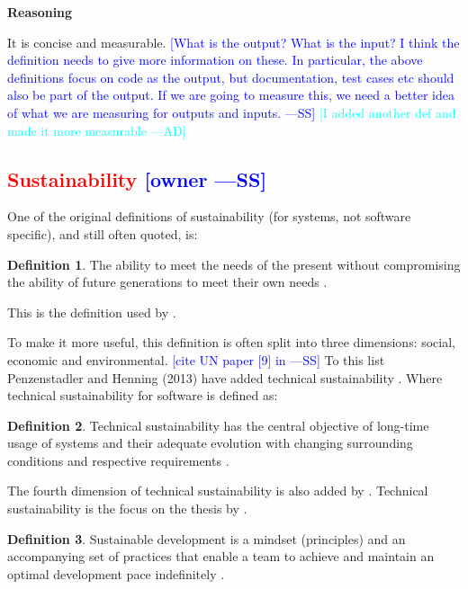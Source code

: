 \documentclass[letterpaper,cleveref]{lipics-v2019}
\newcommand{\authornote}[3]{\textcolor{#1}{[#3 ---#2]}}
\newcommand{\authornote}[3]{}
\newcommand{\wss}[1]{\authornote{blue}{SS}{#1}} %
\newcommand{\ad}[1]{\authornote{cyan}{AD}{#1}} %
\newcommand{\notdone}[1]{\textcolor{red}{#1}}
\theoremstyle{definition}
\newtheorem{defn}{Definition}
\begin{document}
\noindent \textbf{Reasoning}

It is concise and measurable. \wss{What is the output?  What is the input?  I
	think the definition needs to give more information on these.  In particular,
	the above definitions focus on code as the output, but documentation, test
	cases etc should also be part of the output.  If we are going to measure this,
	we need a better idea of what we are measuring for outputs and inputs.}
	\ad{I added another def and made it more measurable}

\subsection{\notdone{Sustainability} \wss{owner}}

One of the original definitions of sustainability (for systems, not software
specific), and still often quoted, is:

\begin{defn}
  \noindent The ability to meet the needs of the present without compromising
  the ability of future generations to meet their own needs
  \citep{Brundtland1987}.
\end{defn}

This is the definition used by \citet{IISD2019}.

To make it more useful, this definition is often split into three dimensions:
social, economic and environmental. \wss{cite UN paper [9] in
  \citet{PenzenstadlerAndHenning2013}} To this list Penzenstadler and Henning
(2013) have added technical sustainability \citep{PenzenstadlerAndHenning2013}.
Where technical sustainability for software is defined as:

\begin{defn}
  \noindent Technical sustainability has the central objective of long-time
  usage of systems and their adequate evolution with changing surrounding
  conditions and respective requirements \citep{PenzenstadlerAndHenning2013}.
\end{defn}

The fourth dimension of technical sustainability is also added by
\citep{WolframEtAl2017}.  Technical sustainability is the focus on the thesis by
\citet{Hygerth2016}.

\begin{defn}
  \noindent Sustainable development is a mindset (principles) and an
  accompanying set of practices that enable a team to achieve and maintain an
  optimal development pace indefinitely \citep{Tate2005}.
\end{defn}
\end{document}
